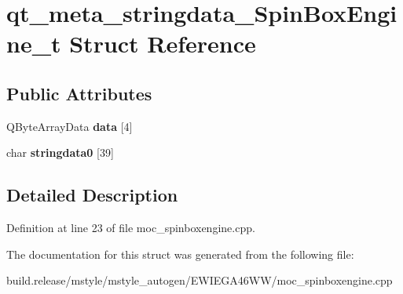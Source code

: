 \hypertarget{structqt__meta__stringdata___spin_box_engine__t}{}\section{qt\+\_\+meta\+\_\+stringdata\+\_\+\+Spin\+Box\+Engine\+\_\+t Struct Reference}
\label{structqt__meta__stringdata___spin_box_engine__t}
\subsection*{Public Attributes}
\begin{DoxyCompactItemize}
\item 
\mbox{\label{structqt__meta__stringdata___spin_box_engine__t_a3e677e743215b9570c11305f9ad4845b}} 
Q\+Byte\+Array\+Data {\bfseries data} \mbox{[}4\mbox{]}
\item 
\mbox{\label{structqt__meta__stringdata___spin_box_engine__t_a60655d54e2ace922c36db60ff8a3af92}} 
char {\bfseries stringdata0} \mbox{[}39\mbox{]}
\end{DoxyCompactItemize}


\subsection{Detailed Description}


Definition at line 23 of file moc\+\_\+spinboxengine.\+cpp.



The documentation for this struct was generated from the following file\+:\begin{DoxyCompactItemize}
\item 
build.\+release/mstyle/mstyle\+\_\+autogen/\+E\+W\+I\+E\+G\+A46\+W\+W/moc\+\_\+spinboxengine.\+cpp\end{DoxyCompactItemize}
